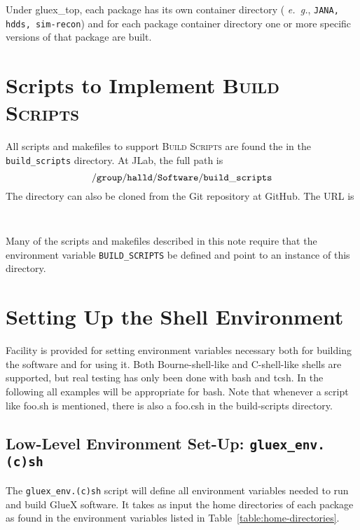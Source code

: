 \documentclass[12pt]{article}
\newcommand{\bs}{\textsc{Build Scripts}}
\begin{document}
Under gluex\_top, each package has its own container directory ({\it
  e.~g.}, {\tt JANA, hdds, sim-recon}) and for each package container
directory one or more specific versions of that package are built.

\section{Scripts to Implement \bs{}}

All scripts and makefiles to support \bs{} are found the in the {\tt
  build\_scripts} directory. At JLab, the full path is
$${\tt /group/halld/Software/build\_scripts}$$
The directory can also be cloned from the Git repository at GitHub. The URL is
\begin{center}\tt 
\end{center}
Many of the scripts and makefiles described in this note require that
the environment variable {\tt BUILD\_SCRIPTS} be defined and point to
an instance of this directory.

\section{Setting Up the Shell Environment}

Facility is provided for setting environment variables necessary both
for building the software and for using it. Both Bourne-shell-like and
C-shell-like shells are supported, but real testing has only been done
with bash and tcsh. In the following all examples will be appropriate
for bash. Note that whenever a script like foo.sh is mentioned, there
is also a foo.csh in the build-scripts directory.

\subsection{Low-Level Environment Set-Up: {\tt gluex\_env.(c)sh}}
\label{section:low-level-environment-setting}

The {\tt gluex\_env.(c)sh} script will define all environment
variables needed to run and build GlueX software. It takes as input
the home directories of each package as found in the environment
variables listed in Table~\ref{table:home-directories}.
\end{document}
